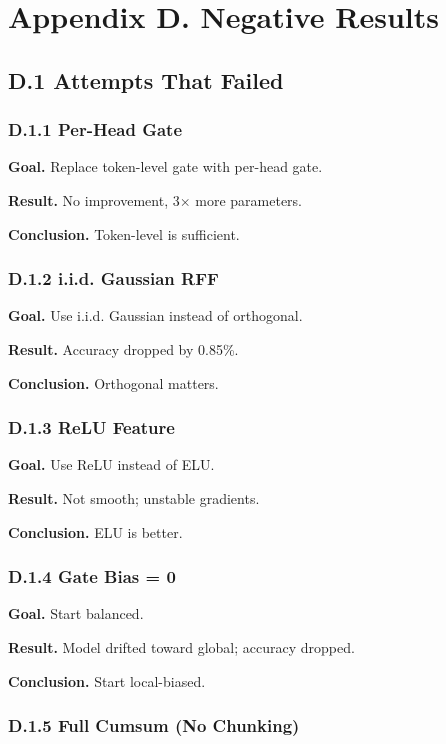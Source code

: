
\section{Appendix D. Negative Results}

\subsection{D.1 Attempts That Failed}

\subsubsection{D.1.1 Per-Head Gate}

\textbf{Goal.} Replace token-level gate with per-head gate.

\textbf{Result.} No improvement, 3$\times$ more parameters.

\textbf{Conclusion.} Token-level is sufficient.

\subsubsection{D.1.2 i.i.d. Gaussian RFF}

\textbf{Goal.} Use i.i.d. Gaussian instead of orthogonal.

\textbf{Result.} Accuracy dropped by 0.85\%.

\textbf{Conclusion.} Orthogonal matters.

\subsubsection{D.1.3 ReLU Feature}

\textbf{Goal.} Use ReLU instead of ELU.

\textbf{Result.} Not smooth; unstable gradients.

\textbf{Conclusion.} ELU is better.

\subsubsection{D.1.4 Gate Bias = 0}

\textbf{Goal.} Start balanced.

\textbf{Result.} Model drifted toward global; accuracy dropped.

\textbf{Conclusion.} Start local-biased.

\subsubsection{D.1.5 Full Cumsum (No Chunking)}

